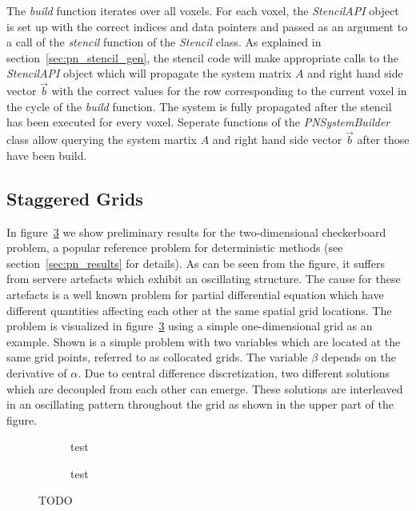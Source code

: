 The \emph{build} function iterates over all voxels. For each voxel, the \emph{StencilAPI} object is set up with the correct indices and data pointers and passed as an argument to a call of the \emph{stencil} function of the \emph{Stencil} class. As explained in section~\ref{sec:pn_stencil_gen}, the stencil code will make appropriate calls to the \emph{StencilAPI} object which will propagate the system matrix $A$ and right hand side vector $\vec{b}$ with the correct values for the row corresponding to the current voxel in the cycle of the \emph{build} function. The system is fully propagated after the stencil has been executed for every voxel. Seperate functions of the \emph{PNSystemBuilder} class allow querying the system martix $A$ and right hand side vector $\vec{b}$ after those have been build.

\subsection{Staggered Grids}
\label{sec:pn_staggered}

In figure~\ref{fig:pn_staggered_grid_problems} we show preliminary results for the two-dimensional checkerboard problem, a popular reference problem for deterministic methods (see section~\ref{sec:pn_results} for details). As can be seen from the figure, it suffers from servere artefacts which exhibit an oscillating structure. The cause for these artefacts is a well known problem for partial differential equation which have different quantities affecting each other at the same spatial grid locations. The problem is visualized in figure~\ref{fig:pn_staggered_grid_problems} using a simple one-dimensional grid as an example. Shown is a simple problem with two variables which are located at the same grid points, referred to as collocated grids. The variable $\beta$ depends on the derivative of $\alpha$. Due to central difference discretization, two different solutions which are decoupled from each other can emerge. These solutions are interleaved in an oscillating pattern throughout the grid as shown in the upper part of the figure.

\begin{figure}[h]
\centering
\begin{subfigure}{0.49\columnwidth}
\caption{test}
\label{fig:pn_collocated_grid_artefacts}
\end{subfigure}%
\hspace{0.01\columnwidth}
\begin{subfigure}{0.49\columnwidth}
\caption{test}
\label{fig:pn_staggered_grid_idea}
\end{subfigure}%
\caption{TODO}
\label{fig:pn_staggered_grid_problems}
\end{figure}

